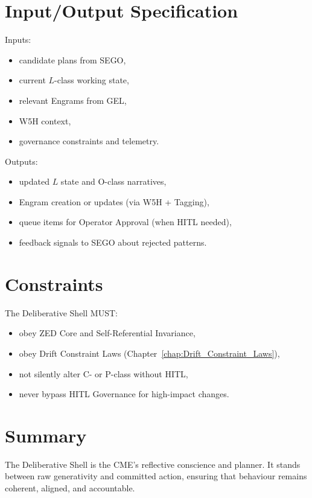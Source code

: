 \section{Input/Output Specification}

Inputs:
\begin{itemize}
    \item candidate plans from SEGO,
    \item current $L$-class working state,
    \item relevant Engrams from GEL,
    \item W5H context,
    \item governance constraints and telemetry.
\end{itemize}

Outputs:
\begin{itemize}
    \item updated $L$ state and O-class narratives,
    \item Engram creation or updates (via W5H + Tagging),
    \item queue items for Operator Approval (when HITL needed),
    \item feedback signals to SEGO about rejected patterns.
\end{itemize}

\section{Constraints}

The Deliberative Shell MUST:
\begin{itemize}
    \item obey ZED Core and Self-Referential Invariance,
    \item obey Drift Constraint Laws (Chapter~\ref{chap:Drift_Constraint_Laws}),
    \item not silently alter C- or P-class without HITL,
    \item never bypass HITL Governance for high-impact changes.
\end{itemize}

\section{Summary}

The Deliberative Shell is the CME’s reflective conscience and planner. It stands
between raw generativity and committed action, ensuring that behaviour remains
coherent, aligned, and accountable.

